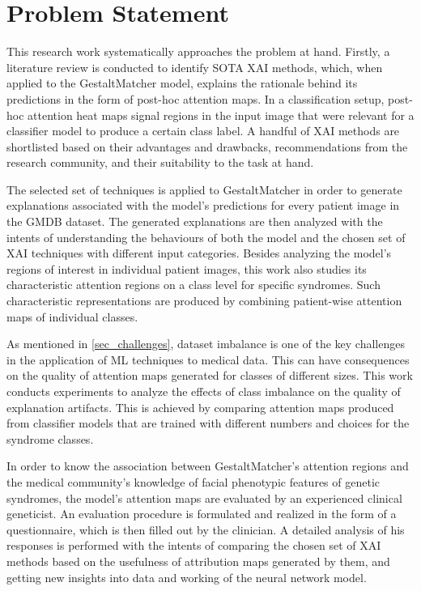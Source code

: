 \documentclass[../report.tex]{subfiles}
\begin{document}
    \section{Problem Statement}
    \noindent
 	This research work systematically approaches the problem at hand. Firstly, a literature review is conducted to identify SOTA XAI methods, which, when applied to the GestaltMatcher model, explains the rationale behind its predictions in the form of post-hoc attention maps. In a classification setup, post-hoc attention heat maps signal regions in the input image that were relevant for a classifier model to produce a certain class label. A handful of XAI methods are shortlisted based on their advantages and drawbacks, recommendations from the research community, and their suitability to the task at hand. 
 	
 	The selected set of techniques is applied to GestaltMatcher in order to generate explanations associated with the model's predictions for every patient image in the GMDB dataset. The generated explanations are then analyzed with the intents of understanding the behaviours of both the model and the chosen set of XAI techniques with different input categories. Besides analyzing the model's regions of interest in individual patient images, this work also studies its characteristic attention regions on a class level for specific syndromes. Such characteristic representations are produced by combining patient-wise attention maps of individual classes. 
 	
 	As mentioned in \ref{sec_challenges}, dataset imbalance is one of the key challenges in the application of ML techniques to medical data. This can have consequences on the quality of attention maps generated for classes of different sizes. This work conducts experiments to analyze the effects of class imbalance on the quality of explanation artifacts. This is achieved by comparing attention maps produced from classifier models that are trained with different numbers and choices for the syndrome classes. 
 	
 	In order to know the association between GestaltMatcher's attention regions and the medical community's knowledge of facial phenotypic features of genetic syndromes, the model's attention maps are evaluated by an experienced clinical geneticist. An evaluation procedure is formulated and realized in the form of a questionnaire, which is then filled out by the clinician. A detailed analysis of his responses is performed with the intents of comparing the chosen set of XAI methods based on the usefulness of attribution maps generated by them, and getting new insights into data and working of the neural network model.
 	 
\end{document}
